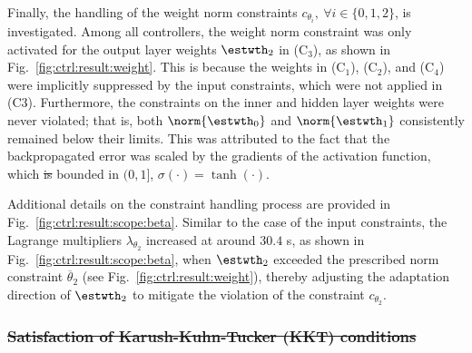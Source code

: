 \documentclass[letterpaper, journal]{IEEEtran}
\providecommand{\DIFadd}[1]{{\protect\color{blue}\uwave{#1}}} %
\providecommand{\DIFdel}[1]{{\protect\color{red}\sout{#1}}} %
\providecommand{\DIFaddbegin}{} %
\providecommand{\DIFaddend}{} %
\providecommand{\DIFdelbegin}{} %
\providecommand{\DIFdelend}{} %
\begin{document}
\hfill 

Finally, the handling of the weight norm constraints $c_{\theta_i},\ \forall i\in\{0,1,2\}$, is investigated. 
Among all controllers, the weight norm constraint was only activated for the output layer weights $\estwth_2$ in (C$_3$), as shown in Fig.~\ref{fig:ctrl:result:weight}. 
This is because the weights in (C$_1$), (C$_2$), and (C$_4$) were implicitly suppressed by the input constraints, which were not applied in (C3).
Furthermore, the constraints on the inner and hidden layer weights were never violated; that is, both $\norm{\estwth_0}$ and $\norm{\estwth_1}$ consistently remained below their limits.
This was attributed to the fact that the backpropagated error was scaled by the gradients of the activation function, which \DIFdelbegin \DIFdel{is }\DIFdelend \DIFaddbegin \DIFadd{are }\DIFaddend bounded in $(0,1]$, \ie $\sigma(\cdot)=\tanh(\cdot)$.

Additional details on the constraint handling process are provided in Fig.~\ref{fig:ctrl:result:scope:beta}. 
Similar to the case of the input constraints, the Lagrange multipliers $\lambda_{\theta_2}$ increased at around $30.4$ s, as shown in Fig.~\ref{fig:ctrl:result:scope:beta}, when $\estwth_2$ exceeded the prescribed norm constraint $\overline\theta_2$ (see Fig.~\ref{fig:ctrl:result:weight}), thereby adjusting the adaptation direction of $\estwth_2$ to mitigate the violation of the constraint $c_{\theta_2}$.


\DIFdelbegin %
\DIFdelend %

    \DIFdelbegin \subsubsection{\DIFdel{Satisfaction of Karush-Kuhn-Tucker (KKT) conditions}}
\addtocounter{subsubsection}{-1}%
\DIFdelend %
\end{document}

